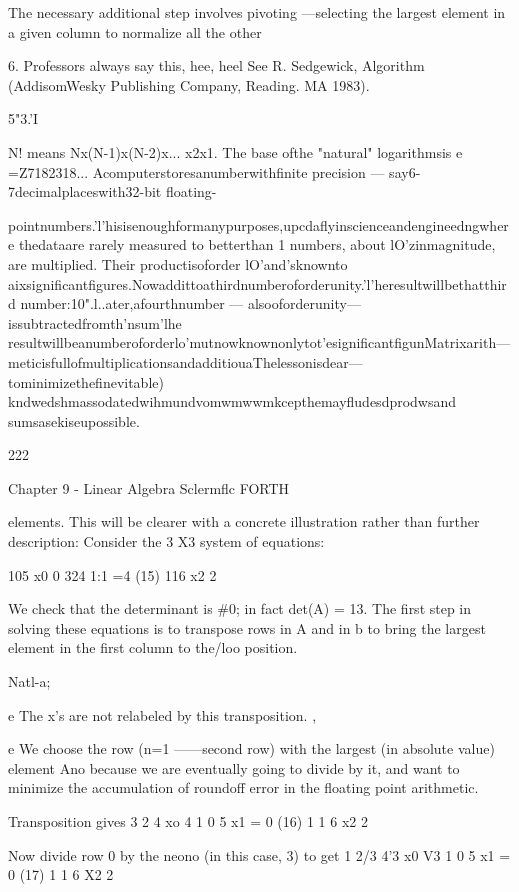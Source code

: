 {The necessary additional step involves pivoting —selecting the
largest element in a given column to normalize all the other

 

6. Professors always say this, hee, heel See R. Sedgewick, Algorithm (AddisomWesky Publishing
Company, Reading. MA 1983).

5"3.'I

N! means Nx(N-1)x(N-2)x... x2x1. The base ofthe "natural" logarithmsis e =Z7182318...
Acomputerstoresanumberwithfinite precision — say6-7decimalplaceswith32-bit floating-

pointnumbers.'l'hisisenoughformanypurposes,upcdaflyinscienceandengineedngwhere
thedataare rarely measured to betterthan 1%
numbers, about lO'zinmagnitude, are multiplied. Their productisoforder lO'and'sknownto
aixsignificantfigures.Nowaddittoathirdnumberoforderunity.'l'heresultwillbethatthird
number:10".l..ater,afourthnumber — alsooforderunity— issubtractedfromth'nsum'lhe
resultwillbeanumberoforderlo'mutnowknownonlytot'esignificantfigunMatrixarith—
meticisfullofmultiplicationsandadditiouaThelessonisdear— tominimizethefinevitable)
kndwedshmassodatedwihmundvomwmwwmkcepthemayfludesdprodwsand
sumsasekiseupossible.

222

Chapter 9 - Linear Algebra Sclermflc FORTH

elements. This will be clearer with a concrete illustration rather
than further description: Consider the 3 X3 system of equations:

105 x0 0
324 1:1 =4 (15)
116 x2 2

We check that the determinant is \#0; in fact det(A) = 13. The first
step in solving these equations is to transpose rows in A and in b
to bring the largest element in the first column to the/loo position.

Natl-a;

e The x's are not relabeled by this transposition. ,

e We choose the row (n=1 ——second row) with the largest (in
absolute value) element Ano because we are eventually going
to divide by it, and want to minimize the accumulation of
roundoff error in the floating point arithmetic.

Transposition gives
3 2 4 xo 4
1 0 5 x1 = 0 (16)
1 1 6 x2 2

Now divide row 0 by the neono (in this case, 3) to get
1 2/3 4'3 x0 V3
1 0 5 x1 = 0 (17)
1 1 6 X2 2

}
